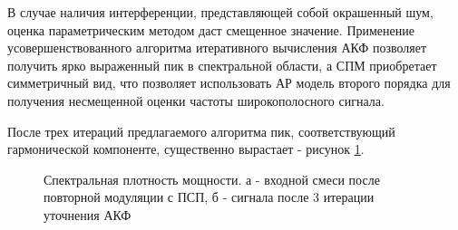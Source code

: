 
В случае наличия интерференции, представляющей собой окрашенный шум, оценка параметрическим методом даст смещенное значение.
Применение усовершенствованного алгоритма итеративного вычисления АКФ позволяет получить ярко выраженный пик в спектральной области,
а СПМ приобретает симметричный вид, что позволяет использовать АР модель второго порядка для получения несмещенной оценки частоты
широкополосного сигнала.

После трех 
итераций предлагаемого алгоритма пик, соответствующий гармонической компоненте, существенно вырастает - рисунок \ref{pic:GPS_spectrum_iter3}.
\begin{figure}[h]
	\center{}
	\caption{Спектральная плотность мощности. а - входной смеси после повторной модуляции с ПСП, б - сигнала после 3 итерации уточнения АКФ}
	\label{pic:GPS_spectrum_iter3}
\end{figure}

